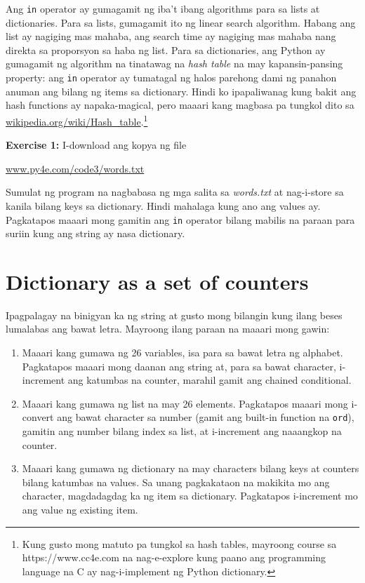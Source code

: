 \documentclass[10pt,]{book}
\begin{document}
Ang \texttt{in} operator ay gumagamit ng iba't ibang algorithms para sa
lists at dictionaries. Para sa lists, gumagamit ito ng linear search
algorithm. Habang ang list ay nagiging mas mahaba, ang search time ay
nagiging mas mahaba nang direkta sa proporsyon sa haba ng list. Para sa
dictionaries, ang Python ay gumagamit ng algorithm na tinatawag na
\emph{hash table} na may kapansin-pansing property: ang \texttt{in}
operator ay tumatagal ng halos parehong dami ng panahon anuman ang
bilang ng items sa dictionary. Hindi ko ipapaliwanag kung bakit ang hash
functions ay napaka-magical, pero maaari kang magbasa pa tungkol dito sa
\href{https://wikipedia.org/wiki/Hash_table}{wikipedia.org/wiki/Hash\_table}.\footnote{Kung
  gusto mong matuto pa tungkol sa hash tables, mayroong course sa
  https://www.cc4e.com na nag-e-explore kung paano ang programming
  language na C ay nag-i-implement ng Python dictionary.}

  

\textbf{Exercise 1:} I-download ang kopya ng file

\href{http://www.py4e.com/code3/words.txt}{www.py4e.com/code3/words.txt}

Sumulat ng program na nagbabasa ng mga salita sa \emph{words.txt} at
nag-i-store sa kanila bilang keys sa dictionary. Hindi mahalaga kung ano
ang values ay. Pagkatapos maaari mong gamitin ang \texttt{in} operator
bilang mabilis na paraan para suriin kung ang string ay nasa dictionary.

\section{Dictionary as a set of
counters}\label{dictionary-as-a-set-of-counters}


Ipagpalagay na binigyan ka ng string at gusto mong bilangin kung ilang
beses lumalabas ang bawat letra. Mayroong ilang paraan na maaari mong
gawin:

\begin{enumerate}
\def\labelenumi{\arabic{enumi}.}
\item
  Maaari kang gumawa ng 26 variables, isa para sa bawat letra ng
  alphabet. Pagkatapos maaari mong daanan ang string at, para sa bawat
  character, i-increment ang katumbas na counter, marahil gamit ang
  chained conditional.
\item
  Maaari kang gumawa ng list na may 26 elements. Pagkatapos maaari mong
  i-convert ang bawat character sa number (gamit ang built-in function
  na \texttt{ord}), gamitin ang number bilang index sa list, at
  i-increment ang naaangkop na counter.
\item
  Maaari kang gumawa ng dictionary na may characters bilang keys at
  counters bilang katumbas na values. Sa unang pagkakataon na makikita
  mo ang character, magdadagdag ka ng item sa dictionary. Pagkatapos
  i-increment mo ang value ng existing item.
\end{enumerate}
\end{document}
